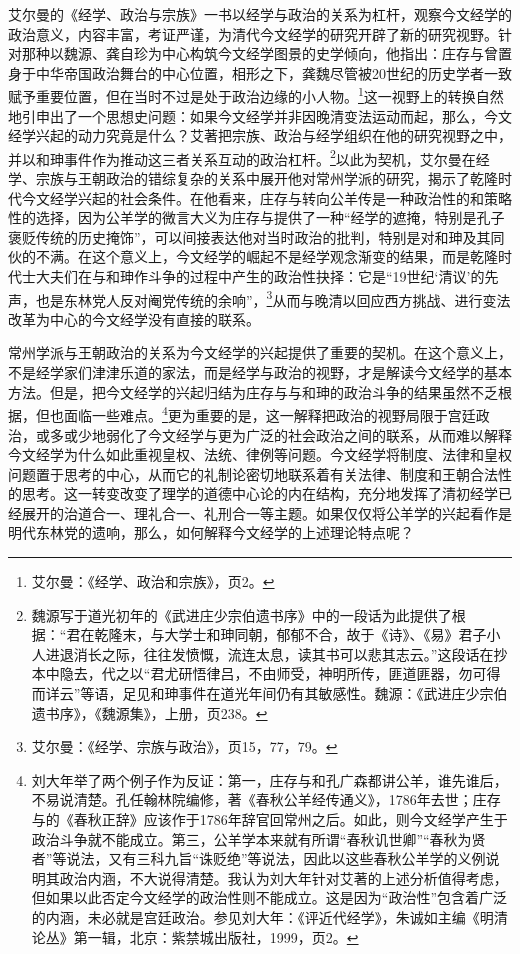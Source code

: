 \documentclass[a4paper, 12pt, openright]{ctexbook}
\begin{document}
艾尔曼的《经学、政治与宗族》一书以经学与政治的关系为杠杆，观察今文经学的政治意义，内容丰富，考证严谨，为清代今文经学的研究开辟了新的研究视野。针对那种以魏源、龚自珍为中心构筑今文经学图景的史学倾向，他指出：庄存与曾置身于中华帝国政治舞台的中心位置，相形之下，龚魏尽管被20世纪的历史学者一致赋予重要位置，但在当时不过是处于政治边缘的小人物。\footnote{艾尔曼：《经学、政治和宗族》，页2。}这一视野上的转换自然地引申出了一个思想史问题：如果今文经学并非因晚清变法运动而起，那么，今文经学兴起的动力究竟是什么？艾著把宗族、政治与经学组织在他的研究视野之中，并以和珅事件作为推动这三者关系互动的政治杠杆。\footnote{魏源写于道光初年的《武进庄少宗伯遗书序》中的一段话为此提供了根据：“君在乾隆末，与大学士和珅同朝，郁郁不合，故于《诗》、《易》君子小人进退消长之际，往往发愤慨，流连太息，读其书可以悲其志云。”这段话在抄本中隐去，代之以“君尤研悟律吕，不由师受，神明所传，匪道匪器，勿可得而详云”等语，足见和珅事件在道光年间仍有其敏感性。魏源：《武进庄少宗伯遗书序》，《魏源集》，上册，页238。}以此为契机，艾尔曼在经学、宗族与王朝政治的错综复杂的关系中展开他对常州学派的研究，揭示了乾隆时代今文经学兴起的社会条件。在他看来，庄存与转向公羊传是一种政治性的和策略性的选择，因为公羊学的微言大义为庄存与提供了一种“经学的遮掩，特别是孔子褒贬传统的历史掩饰”，可以间接表达他对当时政治的批判，特别是对和珅及其同伙的不满。在这个意义上，今文经学的崛起不是经学观念渐变的结果，而是乾隆时代士大夫们在与和珅作斗争的过程中产生的政治性抉择：它是“19世纪‘清议’的先声，也是东林党人反对阉党传统的余响”，\footnote{艾尔曼：《经学、宗族与政治》，页15，77，79。}从而与晚清以回应西方挑战、进行变法改革为中心的今文经学没有直接的联系。

常州学派与王朝政治的关系为今文经学的兴起提供了重要的契机。在这个意义上，不是经学家们津津乐道的家法，而是经学与政治的视野，才是解读今文经学的基本方法。但是，把今文经学的兴起归结为庄存与与和珅的政治斗争的结果虽然不乏根据，但也面临一些难点。\footnote{刘大年举了两个例子作为反证：第一，庄存与和孔广森都讲公羊，谁先谁后，不易说清楚。孔任翰林院编修，著《春秋公羊经传通义》，1786年去世；庄存与的《春秋正辞》应该作于1786年辞官回常州之后。如此，则今文经学产生于政治斗争就不能成立。第三，公羊学本来就有所谓“春秋讥世卿”“春秋为贤者”等说法，又有三科九旨“诛贬绝”等说法，因此以这些春秋公羊学的义例说明其政治内涵，不大说得清楚。我认为刘大年针对艾著的上述分析值得考虑，但如果以此否定今文经学的政治性则不能成立。这是因为“政治性”包含着广泛的内涵，未必就是宫廷政治。参见刘大年：《评近代经学》，朱诚如主编《明清论丛》第一辑，北京：紫禁城出版社，1999，页2。}更为重要的是，这一解释把政治的视野局限于宫廷政治，或多或少地弱化了今文经学与更为广泛的社会政治之间的联系，从而难以解释今文经学为什么如此重视皇权、法统、律例等问题。今文经学将制度、法律和皇权问题置于思考的中心，从而它的礼制论密切地联系着有关法律、制度和王朝合法性的思考。这一转变改变了理学的道德中心论的内在结构，充分地发挥了清初经学已经展开的治道合一、理礼合一、礼刑合一等主题。如果仅仅将公羊学的兴起看作是明代东林党的遗响，那么，如何解释今文经学的上述理论特点呢？
\end{document}
